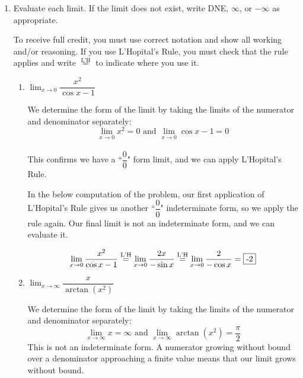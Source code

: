 \documentclass{article}
\begin{document}
\begin{enumerate}


    \item %
    Evaluate each limit. If the limit does not exist, write DNE, $\infty$, or $-\infty$ as appropriate. 
    
     To receive full credit, you must use correct notation and show all working and/or reasoning. If you use L'Hopital's Rule, you must check that the rule applies and write $\stackrel{\text{L'H}}{=}$ to indicate where you use it.
    \begin{enumerate}
        \item 
        \begin{problem}
        $\displaystyle\lim_{x\to 0}\dfrac{x^2}{\cos x-1}$
        \end{problem}
        \pspace{\vfill}

        \begin{solution}
            We determine the form of the limit by taking the limits of the numerator and denominator separately:
            \[ \lim_{x\to 0} x^2 = 0 \text{ and } \displaystyle \lim_{x\to 0} \cos x -1 = 0
            \]\\
            
            This confirms we have a ``$\dfrac{0}{0}$" form limit, and we can apply L'Hopital's Rule.
            
            In the below computation of the problem, our first application of L'Hopital's Rule gives us another ``$\dfrac{0}{0}$" indeterminate form, so we apply the rule again. Our final limit is not an indeterminate form, and we can evaluate it.
            
            $$\lim_{x\to 0}\dfrac{x^2}{\cos x-1} \stackrel{\text{L'H}}{=} \lim_{x\to 0} \dfrac{2x}{-\sin x}\stackrel{\text{L'H}}{=}\lim_{x\to 0} \frac{2}{-\cos x} = \fbox{-2}$$
        \end{solution}
        \item 
        \begin{problem}
        $\displaystyle\lim_{x\to \infty}\dfrac{x}{\arctan(x^2)}$
        \end{problem}
        \pspace{\vfill}
        
        \begin{solution}
            We determine the form of the limit by taking the limits of the numerator and denominator separately:
            \[
            \lim_{x\to \infty} x = \infty \text{ and } 
            \displaystyle \lim_{x\to \infty} \arctan(x^2) = \dfrac{\pi}{2}
            \]
            This is not an indeterminate form. A numerator growing without bound over a denominator approaching a finite value means that our limit grows without bound.\\


\end{solution}
\end{enumerate}
\end{enumerate}
\end{document}
